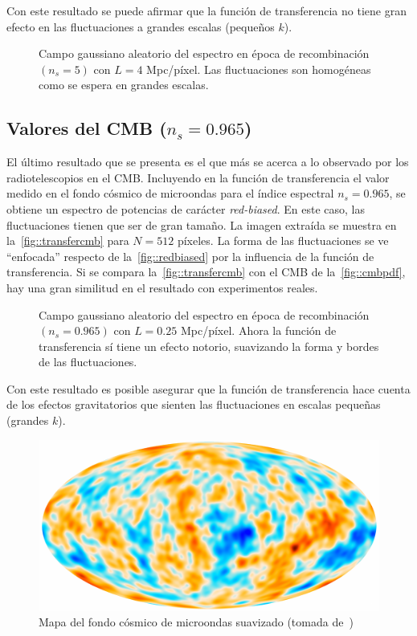 Con este resultado se puede afirmar que la función de transferencia no tiene gran efecto en las fluctuaciones a grandes escalas (pequeños \(k\)).
\begin{figure}
    \centering
    \def\svgwidth{.94\textwidth}
    
    \caption[Espectro en época de recombinación \(N=256\) píxeles\protect\newline y \(L=4\) Mpc/píxel]{Campo gaussiano aleatorio del espectro en época de recombinación \((n_s=5)\) con \(L=4\) Mpc/píxel. Las fluctuaciones son homogéneas como se espera en grandes escalas.}
    \label{fig::transfergrandes}
\end{figure}
\clearpage
\subsection{Valores del CMB (\texorpdfstring{\(n_s=0.965\)}{ns=0.965})}
El último resultado que se presenta es el que más se acerca a lo observado por los radiotelescopios en el CMB. Incluyendo en la función de transferencia el valor medido en el fondo cósmico de microondas para el índice espectral \(n_s=0.965\), se obtiene un espectro de potencias de carácter \textit{red-biased}. En este caso, las fluctuaciones tienen que ser de gran tamaño. La imagen extraída se muestra en la~\autoref{fig::transfercmb} para \(N=512\) píxeles. La forma de las fluctuaciones se ve ``enfocada'' respecto de la~\autoref{fig::redbiased} por la influencia de la función de transferencia. Si se compara la~\autoref{fig::transfercmb} con el CMB de la~\autoref{fig::cmbpdf}, hay una gran similitud en el resultado con experimentos reales.
\begin{figure}[h!]
    \centering
    {}
    \caption[Valores del CMB \(N=512\) píxeles y \(L=0.25\) Mpc/píxel]{Campo gaussiano aleatorio del espectro en época de recombinación \((n_s=0.965)\) con \(L=0.25\) Mpc/píxel. Ahora la función de transferencia sí tiene un efecto notorio, suavizando la forma y bordes de las fluctuaciones.}
    \label{fig::transfercmb}
\end{figure}

Con este resultado es posible asegurar que la función de transferencia hace cuenta de los efectos gravitatorios que sienten las fluctuaciones en escalas pequeñas (grandes \(k\)).
\begin{figure}[t]
    \centering
    \includegraphics[scale=.6]{img/Planck_2018_Pol_CMB.pdf}
    \caption[Mapa del fondo cósmico de microondas suavizado]{Mapa del fondo cósmico de microondas suavizado (tomada de~\cite{collaboration2020planck4})}
    \label{fig::cmbpdf}
\end{figure}
